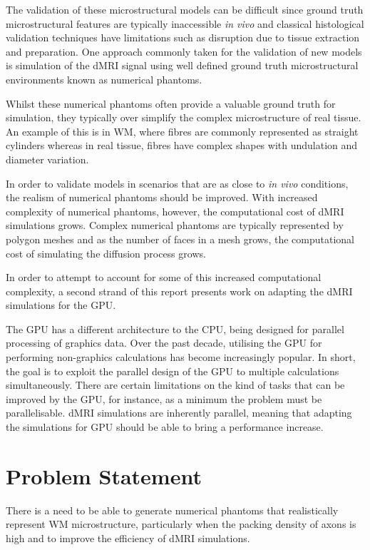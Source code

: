 The validation of these microstructural models can be difficult since ground truth microstructural features are typically inaccessible \emph{in vivo} and classical histological validation techniques have limitations such as disruption due to tissue extraction and preparation. 
One approach commonly taken for the validation of new models is simulation of the \ac{dMRI} signal using well defined ground truth microstructural environments known as numerical phantoms. 

Whilst these numerical phantoms often provide a valuable ground truth for simulation, they typically over simplify the complex microstructure of real tissue.
An example of this is in \ac{WM}, where fibres are commonly represented as straight cylinders\cite{Hall2009,Leemans2005} whereas in real tissue, fibres have complex shapes with undulation and diameter variation\cite{Nilsson2013,Lee2018a}.

In order to validate models in scenarios that are as close to \emph{in vivo} conditions, the realism of numerical phantoms should be improved.
With increased complexity of numerical phantoms, however, the computational cost of \ac{dMRI} simulations grows. Complex numerical phantoms are typically represented by polygon meshes and as the number of faces in a mesh grows, the computational cost of simulating the diffusion process grows.

In order to attempt to account for some of this increased computational complexity, a second strand of this report presents work on adapting the \ac{dMRI} simulations for the \ac{GPU}.

The \ac{GPU} has a different architecture to the \ac{CPU}, being designed for parallel processing of graphics data.
Over the past decade, utilising the GPU for performing non-graphics calculations has become increasingly popular. 
In short, the goal is to exploit the parallel design of the \ac{GPU} to multiple calculations simultaneously.
There are certain limitations on the kind of tasks that can be improved by the \ac{GPU}, for instance, as a minimum the problem must be parallelisable.
\ac{dMRI} simulations are inherently parallel, meaning that adapting the simulations for \ac{GPU} should be able to bring a performance increase. 

\section{Problem Statement}
\label{sec:intro_problem_statement}
There is a need to be able to generate numerical phantoms that realistically represent \ac{WM} microstructure, particularly when the packing density of axons is high and to improve the efficiency of \ac{dMRI} simulations.


